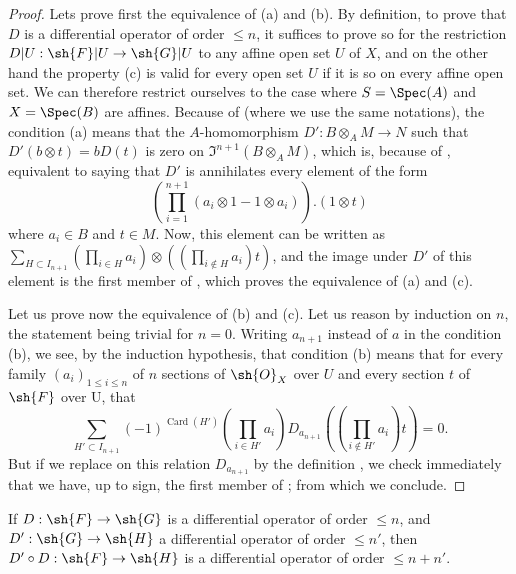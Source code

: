 \begin{proof}
Lets prove first the equivalence of (a) and (b).
By definition, to prove that $D$ is a differential operator of order $\leq n$, it suffices to prove so for the restriction $D|U: \sh{F}|U \to \sh{G}|U$ to any affine open set $U$ of $X$, and on the other hand the property (c) is valid for every open set $U$ if it is so on every affine open set.
We can therefore restrict ourselves to the case where $S = \Spec(A)$ and $X = \Spec(B)$ are affines.
Because of  (where we use the same notations), the condition (a) means that the $A$-homomorphism $D': B \otimes_A M \to N$ such that $D'(b \otimes t) = b D(t)$ is zero on $\mathfrak{I}^{n+1}(B \otimes_A M)$, which is, because of , equivalent to saying that $D'$ is annihilates every element of the form
\[
  (\prod_{i=1}^{n+1} (a_i \otimes 1 - 1 \otimes a_i) ) . (1 \otimes t)
\]
 where $a_i \in B$ and $t \in M$.
Now, this element can be written as $\sum_{H \subset I_{n+1}} (\prod_{i \in H} a_i) \otimes ((\prod_{i \notin H} a_i ) t )$, and the image under $D'$ of this element is the first member of , which proves the equivalence of (a) and (c).

Let us prove now the equivalence of (b) and (c).
Let us reason by induction on $n$, the statement being trivial for $n=0$.
Writing $a_{n+1}$ instead of $a$ in the condition (b), we see, by the induction hypothesis, that condition (b) means that for every family $(a_i)_{1 \leq i \leq n}$ of $n$ sections of $\sh{O}_X$ over $U$ and every section $t$ of $\sh{F}$ over U, that
\[
  \sum_{H' \subset I_{n+1}} (-1)^{\operatorname{Card}(H')}  (\prod_{i \in H'} a_i) D_{a_{n+1}} ((\prod_{i \notin H'} a_i ) t ) = 0.
\]
But if we replace on this relation $D_{a_{n+1}}$ by the definition , we check immediately that we have, up to sign, the first member of ;
from which we conclude.
\end{proof}

\begin{proposition}[16.8.9]
\label{IV.16.8.9}
If $D: \sh{F} \to \sh{G}$ is a differential operator of order $\leq n$, and $D': \sh{G} \to \sh{H}$ a differential operator of order $\leq n'$, then $D' \circ D: \sh{F} \to \sh{H}$ is a differential operator of order $\leq n + n'$.
\end{proposition}


